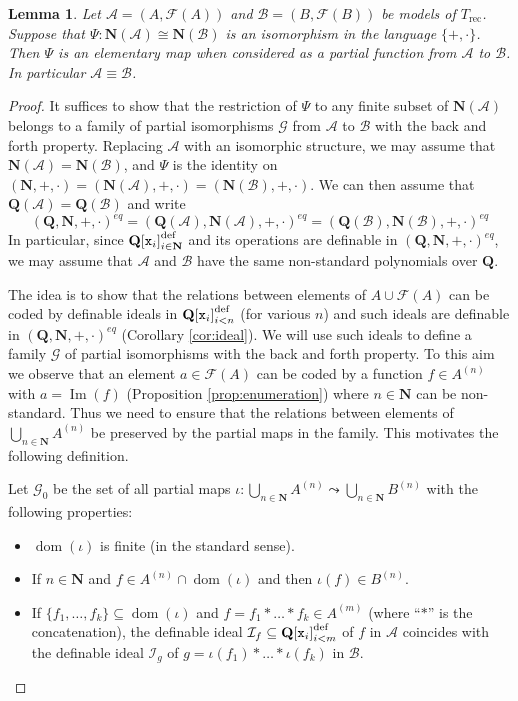 \documentclass{amsart}
\newcommand{\A}{\mathcal A}
\newcommand{\B}{\mathcal B}
\newcommand{\ca}{\mathcal}
\newcommand{\ideal}[1]{\ca #1}
\newcommand{\dom}{\operatorname{dom}}
\newcommand{\img}{\operatorname{Im}}
\theoremstyle{plain}
\newtheorem{lem}[thm]{Lemma}
\theoremstyle{definition}
\newcommand{\F}{\mathcal{F}}
\newcommand{\hn}{\mathbf N}
\newcommand{\hQ}{\mathbf Q}
\newcommand{\pto}{\leadsto} %
\newcommand{\Poly}{{\hQ[{\tt x}_i]}_{i\in \hn}^{\text{def}}}
\newcommand{\poly}[1]{{\hQ[{\tt x}_i]}_{i<#1}^\text{def}}
\begin{document}
\begin{lem} \label{lem:main} Let $\mathcal A= (A, \F (A))$ and $\mathcal B = (B, \F(B))$ be models of $T_{\text{rec}}$. Suppose that $\Psi: \hn(\ca A) \cong \hn (\ca B)$ is an isomorphism in the language $\{+,\cdot\}$. Then $\Psi$ is an elementary map when considered as a partial function from $\ca A$ to $\ca B$. In particular $\ca A \equiv \ca B$. 
\end{lem} 

\begin{proof} It suffices to show that the restriction of $\Psi$ to any finite subset of $\hn (\ca A)$ belongs to a family of partial isomorphisms $\ca G$ from $\ca A$ to $\ca B$
 with the back and forth property. Replacing $\ca A$ with an isomorphic structure, we may assume that $\hn(\ca A) = \hn(\ca B)$, and $\Psi$ is the identity on $(\hn,+,\cdot) = (\hn (\ca A),+,\cdot) = (\hn (\ca B),+,\cdot)$. 
We can then assume that $\hQ(\ca A) = \hQ(\ca B)$ and 
write
%
$$(\hQ, \hn, +, \cdot)^{eq} = (\hQ(\ca A), \hn (\A), +,\cdot)^{eq} = (\hQ(\ca B), \hn (\B), +,\cdot)^{eq}$$
%
In particular, since $\Poly$ and its operations are definable in $(\hQ, \hn, +,\cdot)^{eq}$, we may assume that $\ca A$ and $\ca B$ have the same non-standard polynomials over $\hQ$. 

The idea is to show that the relations between elements of $A\cup \F(A)$ can be coded by definable ideals in $\poly n$ (for various $n$) and such ideals are definable in $(\hQ,\hn, +, \cdot)^{eq}$ (Corollary \ref{cor:ideal}). We will use such ideals to define a family $\ca G$ of partial isomorphisms with the back and forth property. 
To this aim we observe that an element $a \in \F(A)$ can be coded by a function $f\in A^{(n)}$ with $a = \img(f)$ (Proposition \ref{prop:enumeration}) where $n\in \hn$ can be non-standard. Thus we need to ensure that the relations between elements of   $\bigcup_{n \in \hn} A^{(n)}$ be preserved by the partial maps in the family. This motivates the following definition. 

Let $\ca G_0$ be the set of all partial maps $\iota : \bigcup_{n \in \hn} A^{(n)} \pto \bigcup_{n\in \hn} B^{(n)}$ with the following properties: 
\begin{itemize}
\item $\dom(\iota)$ is finite (in the standard sense). 
\item If $n\in \hn$ and $f\in A^{(n)} \cap \dom(\iota)$ and then $\iota(f) \in B^{(n)}$. 
\item If $\{f_1, \ldots, f_k\} \subseteq \dom(\iota)$ and $f = f_1*\ldots *f_k \in A^{(m)}$ (where ``$*$'' is the concatenation), the definable ideal ${\ideal I}_f \subseteq \poly m$ of $f$ in $\ca A$ coincides with the definable ideal ${\ideal I}_g$ of $g = \iota(f_1)*\ldots * \iota(f_k)$ in $\ca B$. 
\end{itemize}


\end{proof}
\end{document}
